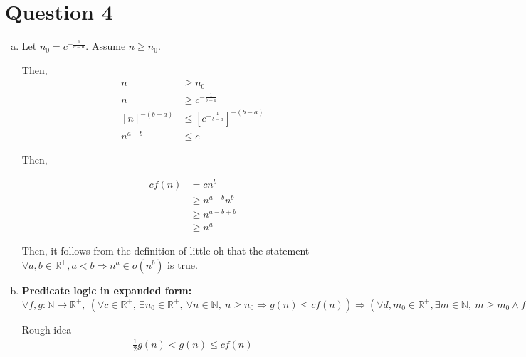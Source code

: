 \documentclass[12pt]{article}
\begin{document}
\section*{Question 4}
\begin{enumerate}[a.]
    \item

    Let $n_0 = c^{-\frac{1}{b-a}}$. Assume $n \geq n_0$.

    \bigskip

    Then,
    \setcounter{equation}{0}
    \begin{align}
        n &\geq n_0\\
        n &\geq c^{-\frac{1}{b-a}}\\
        \left[n\right]^{-(b-a)}&\leq \left[c^{-\frac{1}{b-a}}\right]^{-(b-a)}\\
        n^{a-b} &\leq c
    \end{align}

    \bigskip

    Then,

    \begin{align}
        cf(n) &= cn^b\\
        &\geq n^{a-b}n^b\\
        &\geq n^{a-b+b}\\
        &\geq n^a
    \end{align}

    Then, it follows from the definition of little-oh that the statement
    $\forall a,b \in \mathbb{R}^{+}, a < b \Rightarrow n^a \in o(n^b)$ is true.

    \item

    \textbf{Predicate logic in expanded form:} $\forall f,g:\mathbb{N} \to \mathbb{R}^{+},\:
    (\forall c \in \mathbb{R}^{+},\:\exists n_0 \in \mathbb{R}^{+},\:\forall n \in
    \mathbb{N},\: n \geq n_0 \Rightarrow g(n) \leq cf(n)) \Rightarrow (\forall d,m_0
    \in \mathbb{R}^{+}, \exists m \in \mathbb{N},\: m \geq m_0 \land f(m) > dg(m))$

    \bigskip

    Rough idea
    \setcounter{equation}{0}
    \begin{align}
        \frac{1}{2}g(n) < g(n) \leq cf(n)
    \end{align}


\end{enumerate}
\end{document}
